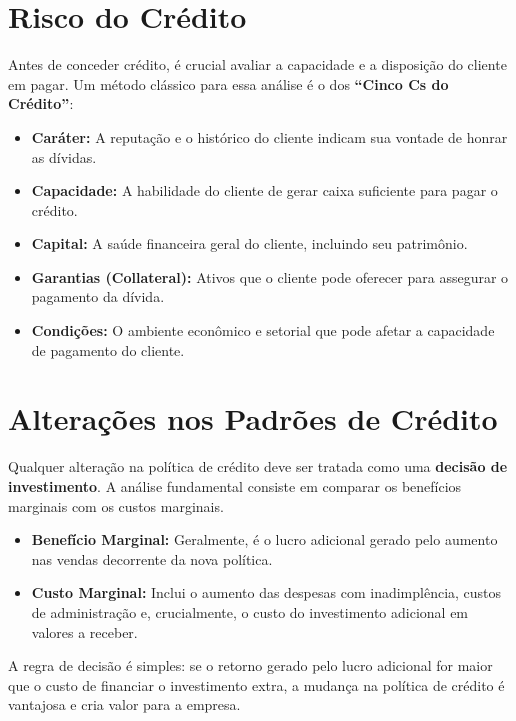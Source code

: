 \documentclass[
  a4paper,
]{book}
\providecommand{\tightlist}{%
  \setlength{\itemsep}{0pt}\setlength{\parskip}{0pt}}\usepackage{longtable,booktabs,array}
\begin{document}
\section{Risco do Crédito}\label{risco-do-cruxe9dito}

Antes de conceder crédito, é crucial avaliar a capacidade e a disposição
do cliente em pagar. Um método clássico para essa análise é o dos
\textbf{``Cinco Cs do Crédito''}:

\begin{itemize}
\tightlist
\item
  \textbf{Caráter:} A reputação e o histórico do cliente indicam sua
  vontade de honrar as dívidas.
\item
  \textbf{Capacidade:} A habilidade do cliente de gerar caixa suficiente
  para pagar o crédito.
\item
  \textbf{Capital:} A saúde financeira geral do cliente, incluindo seu
  patrimônio.
\item
  \textbf{Garantias (Collateral):} Ativos que o cliente pode oferecer
  para assegurar o pagamento da dívida.
\item
  \textbf{Condições:} O ambiente econômico e setorial que pode afetar a
  capacidade de pagamento do cliente.
\end{itemize}

\section{Alterações nos Padrões de
Crédito}\label{alterauxe7uxf5es-nos-padruxf5es-de-cruxe9dito}

Qualquer alteração na política de crédito deve ser tratada como uma
\textbf{decisão de investimento}. A análise fundamental consiste em
comparar os benefícios marginais com os custos marginais.

\begin{itemize}
\tightlist
\item
  \textbf{Benefício Marginal:} Geralmente, é o lucro adicional gerado
  pelo aumento nas vendas decorrente da nova política.
\item
  \textbf{Custo Marginal:} Inclui o aumento das despesas com
  inadimplência, custos de administração e, crucialmente, o custo do
  investimento adicional em valores a receber.
\end{itemize}

A regra de decisão é simples: se o retorno gerado pelo lucro adicional
for maior que o custo de financiar o investimento extra, a mudança na
política de crédito é vantajosa e cria valor para a empresa.
\end{document}
